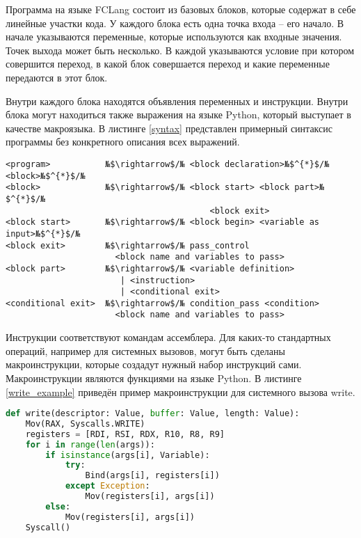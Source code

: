 \documentclass[a4paper,14pt]{extarticle}
\begin{document}
Программа на языке FCLang состоит из базовых блоков, которые содержат в себе линейные участки кода.
У каждого блока есть одна точка входа -- его начало.
В начале указываются переменные, которые используются как входные значения.
Точек выхода может быть несколько.
В каждой указываются условие при котором совершится переход, в какой блок совершается переход и какие переменные передаются в этот блок.

Внутри каждого блока находятся объявления переменных и инструкции.
Внутри блока могут находиться также выражения на языке Python, который выступает в качестве макроязыка.
В листинге \ref{syntax} представлен примерный синтаксис программы без конкретного описания всех выражений.

\begin{lstlisting}[caption=Синтаксис программы на FCLang, label=syntax]
<program>           №$\rightarrow$/№ <block declaration>№$^{*}$/№ <block>№$^{*}$/№
<block>             №$\rightarrow$/№ <block start> <block part>№$^{*}$/№
                                         <block exit>
<block start>       №$\rightarrow$/№ <block begin> <variable as input>№$^{*}$/№
<block exit>        №$\rightarrow$/№ pass_control
                      <block name and variables to pass>
<block part>        №$\rightarrow$/№ <variable definition> 
                       | <instruction>
                       | <conditional exit>
<conditional exit>  №$\rightarrow$/№ condition_pass <condition>
                      <block name and variables to pass>
\end{lstlisting}

Инструкции соответствуют командам ассемблера.
Для каких-то стандартных операций, например для системных вызовов, могут быть сделаны макроинструкции, которые создадут нужный набор инструкций сами.
Макроинструкции являются функциями на языке Python.
В листинге \ref{write_example} приведён пример макроинструкции для системного вызова write.

\begin{lstlisting}[caption=Пример макроинструкции для системного вызова write, label=write_example, float=h, language=Python]
def write(descriptor: Value, buffer: Value, length: Value):
    Mov(RAX, Syscalls.WRITE)
    registers = [RDI, RSI, RDX, R10, R8, R9]
    for i in range(len(args)):
        if isinstance(args[i], Variable):
            try:
                Bind(args[i], registers[i])
            except Exception:
                Mov(registers[i], args[i])
        else:
            Mov(registers[i], args[i])
    Syscall()
\end{lstlisting}
\end{document}
